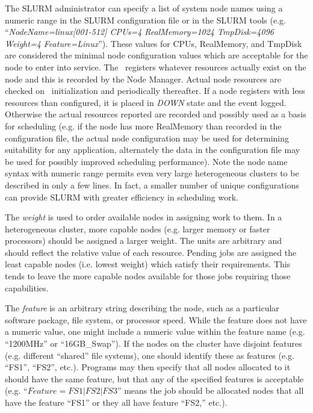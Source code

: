 \documentclass[10pt,onecolumn,times]{../common/llncs}
\begin{document}
{The SLURM administrator can specify a list of system node names using
a numeric range in the SLURM configuration file or in the SLURM tools
(e.g. ``{\em NodeName=linux[001-512] CPUs=4 RealMemory=1024 TmpDisk=4096
Weight=4 Feature=Linux}'').  These values for CPUs, RealMemory, and
TmpDisk are considered the minimal node configuration values which are
acceptable for the node to enter into service.  The \slurmd\ registers
whatever resources actually exist on the node and this is recorded
by the Node Manager.  Actual node resources are checked on \slurmd\
initialization and periodically thereafter.  If a node registers with
less resources than configured, it is placed in {\em DOWN} state and
the event logged.  Otherwise the actual resources reported are recorded
and possibly used as a basis for scheduling (e.g. if the node has more
RealMemory than recorded in the configuration file, the actual node
configuration may be used for determining suitability for any application,
alternately the data in the configuration file may be used for possibly
improved scheduling performance).  Note the node name syntax with numeric
range permits even very large heterogeneous clusters to be described in
only a few lines.  In fact, a smaller number of unique configurations
can provide SLURM with greater efficiency in scheduling work.

The {\em weight} is used to order available nodes in assigning work to
them.  In a heterogeneous cluster, more capable nodes (e.g. larger memory
or faster processors) should be assigned a larger weight.  The units
are arbitrary and should reflect the relative value of each resource.
Pending jobs are assigned the least capable nodes (i.e. lowest weight)
which satisfy their requirements.  This tends to leave the more capable
nodes available for those jobs requiring those capabilities.

The {\em feature} is an arbitrary string describing the node, such as a
particular software package, file system, or processor speed.  While the
feature does not have a numeric value, one might include a numeric value
within the feature name (e.g. ``1200MHz'' or ``16GB\_Swap'').  If the
nodes on the cluster have disjoint features (e.g. different ``shared''
file systems), one should identify these as features (e.g. ``FS1'',
``FS2'', etc.).  Programs may then specify that all nodes allocated to
it should have the same feature, but that any of the specified features
is acceptable (e.g. ``$Feature=FS1|FS2|FS3$'' means the job should be
allocated nodes that all have the feature ``FS1'' or they all have feature
``FS2,'' etc.).

}
\end{document}
